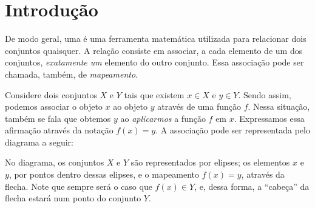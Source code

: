 \section{Introdução}

De modo geral, uma  é uma ferramenta matemática utilizada para relacionar dois conjuntos quaisquer. 
A relação consiste em associar, a cada elemento de um dos conjuntos, \emph{exatamente um} elemento do outro conjunto.
Essa associação pode ser chamada, também, de \emph{mapeamento}.

Considere dois conjuntos $X$ e $Y$ tais que existem $x \in X$ e $y \in Y$. Sendo assim, podemos associar o objeto $x$ ao objeto $y$ através de uma função $f$. Nessa situação, também se fala que obtemos $y$ ao \emph{aplicarmos} a função $f$ em $x$. Expressamos essa afirmação através da notação $f(x) = y$. A associação pode ser representada pelo diagrama a seguir:
%
\begin{center}
\end{center}
%
No diagrama, os conjuntos $X$ e $Y$ são representados por elipses; os elementos $x$ e $y$, por pontos dentro dessas elipses, e o mapeamento $f(x) = y$, através da flecha. Note que sempre será o caso que $f(x) \in Y$, e, dessa forma, a ``cabeça'' da flecha estará num ponto do conjunto $Y$.